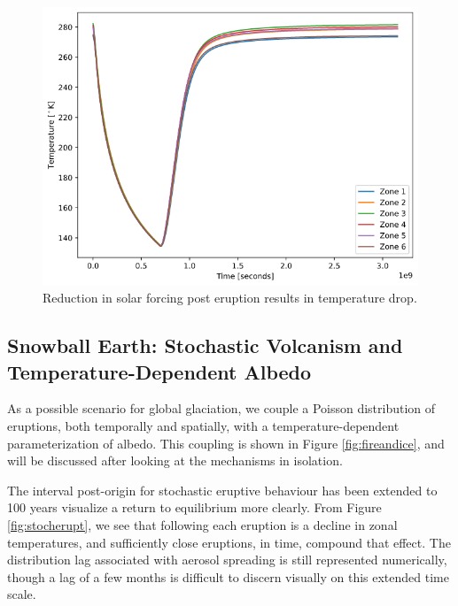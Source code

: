 \documentclass{article}
\begin{document}
\begin{figure}[htbp]
    \centering
    \includegraphics[scale=0.4]{oneerupt.png}
    \caption{Reduction in solar forcing post eruption results in temperature drop.}
    \label{fig:oneerupt}
\end{figure}
\FloatBarrier

\subsection{Snowball Earth: Stochastic Volcanism and Temperature-Dependent Albedo}
As a possible scenario for global glaciation, we couple a Poisson distribution of eruptions, both temporally and spatially, with a temperature-dependent parameterization of albedo. This coupling is shown in Figure \ref{fig:fireandice}, and will be discussed after looking at the mechanisms in isolation.

The interval post-origin for stochastic eruptive behaviour has been extended to 100 years visualize a return to equilibrium more clearly. From Figure \ref{fig:stocherupt}, we see that following each eruption is a decline in zonal temperatures, and sufficiently close eruptions, in time, compound that effect. The distribution lag associated with aerosol spreading is still represented numerically, though a lag of a few months is difficult to discern visually on this extended time scale. 
\end{document}
